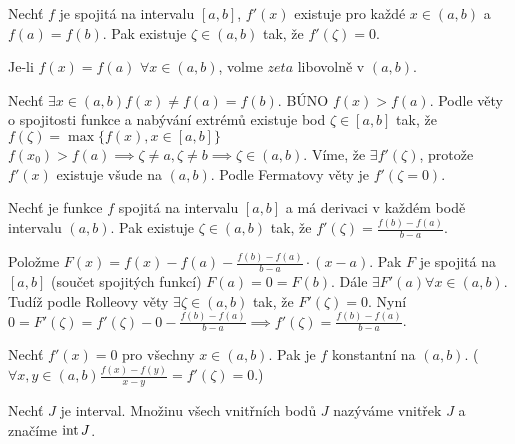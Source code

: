 \documentclass[12pt]{article}					%
\begin{document}
        \begin{veta}[Rolleova]
            Nechť $f$ je spojitá na intervalu $[a, b]$, $f'(x)$ existuje pro každé $x \in (a, b)$ a $f(a) = f(b)$. Pak existuje $\zeta \in (a, b)$ tak, že $f'(\zeta) = 0$.
            
            \begin{dukazin}
                Je-li $f(x) = f(a)$ $\forall x \in (a, b)$, volme $zeta$ libovolně v $(a, b)$.

                Nechť $\exists x \in (a, b) f(x) ≠ f(a) = f(b)$. BÚNO $f(x) > f(a)$. Podle věty o spojitosti funkce a nabývání extrémů existuje bod $\zeta \in [a, b]$ tak, že $f(\zeta) = \max \{f(x), x \in [a, b]\}$ $f(x_0) > f(a) \implies \zeta ≠ a, \zeta ≠ b \implies \zeta \in (a, b)$. Víme, že $\exists f'(\zeta)$, protože $f'(x)$ existuje všude na $(a, b)$. Podle Fermatovy věty je $f'(\zeta = 0)$.
            \end{dukazin}
        \end{veta}

        \begin{veta}
            Nechť je funkce $f$ spojitá na intervalu $[a, b]$ a má derivaci v každém bodě intervalu $(a, b)$. Pak existuje $\zeta \in (a, b)$ tak, že $f'(\zeta) = \frac{f(b) - f(a)}{b-a}$.

            \begin{dukazin}
                Položme $F(x) = f(x) - f(a) - \frac{f(b) - f(a)}{b - a}·(x-a)$. Pak $F$ je spojitá na $[a, b]$ (součet spojitých funkcí) $F(a) = 0 = F(b)$. Dále $\exists F'(a) \forall x \in (a, b)$. Tudíž podle Rolleovy věty $\exists \zeta \in (a, b)$ tak, že $F'(\zeta) = 0$. Nyní $0 = F'(\zeta) = f'(\zeta) - 0 - \frac{f(b) - f(a)}{b-a} \implies f'(\zeta) = \frac{f(b) - f(a)}{b - a}$.
            \end{dukazin}
        \end{veta}

        \begin{dusledek}
            Nechť $f'(x) = 0$ pro všechny $x \in (a, b)$. Pak je $f$ konstantní na $(a, b)$. ($\forall x, y \in (a, b) \frac{f(x) - f(y)}{x - y} = f'(\zeta) = 0$.)
        \end{dusledek}

        \begin{definice}
            Nechť $J$ je interval. Množinu všech vnitřních bodů $J$ nazýváme vnitřek $J$ a značíme $\operatorname{int} J$.
        \end{definice}
\end{document}
